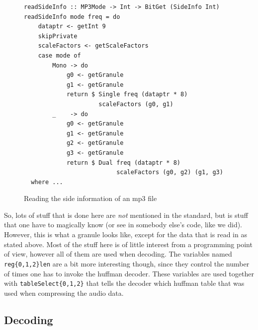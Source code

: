 \documentclass[a4paper,12pt]{article}
\begin{document}
\begin{figure}[h]
  \begin{center}
    \begin{lstlisting}
readSideInfo :: MP3Mode -> Int -> BitGet (SideInfo Int)
readSideInfo mode freq = do
    dataptr <- getInt 9
    skipPrivate
    scaleFactors <- getScaleFactors
    case mode of
        Mono -> do
            g0 <- getGranule
            g1 <- getGranule
            return $ Single freq (dataptr * 8)
                     scaleFactors (g0, g1)
        _    -> do
            g0 <- getGranule
            g1 <- getGranule
            g2 <- getGranule
            g3 <- getGranule
            return $ Dual freq (dataptr * 8)
                          scaleFactors (g0, g2) (g1, g3)
  where ...
    \end{lstlisting}
    \caption{Reading the side information of an mp3 file}\label{fig:sideinfo}
  \end{center}
\end{figure}

    So, lots of stuff that is done here are \textit{not} mentioned in the
    standard, but is stuff that one have to magically know (or see in somebody
    else's code, like we did). However, this is what a granule looks like,
    except for the data that is read in as stated above. Most of the stuff here
    is of little interest from a programming point of view, however all of them
    are used when decoding. The variables named \texttt{reg\{0,1,2\}len} are a
    bit more interesting though, since they control the number of times one has
    to invoke the huffman decoder. These variables are used together with
    \texttt{tableSelect\{0,1,2\}} that tells the decoder which huffman table
    that was used when compressing the audio data.

    \subsection{Decoding}
\end{document}
